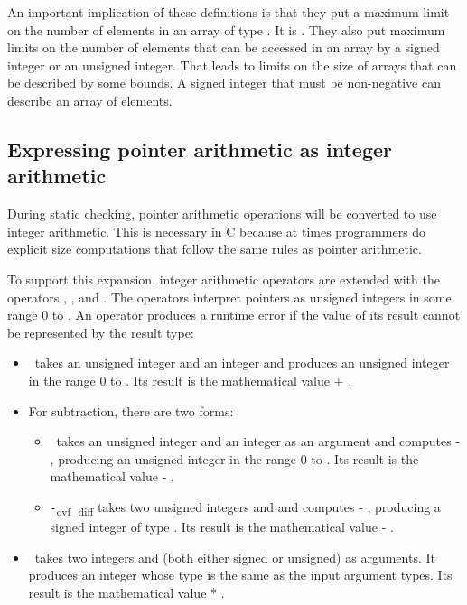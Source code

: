 An important implication of these definitions is that they put a maximum
limit on the number of elements in an array of type . It is
. They also put
maximum limits on the number of elements that can be accessed in an
array by a signed integer or an unsigned integer. That leads to limits
on the size of arrays that can be described by some bounds. A signed
integer that must be non-negative can describe an array of
 elements.

\subsection{Expressing pointer arithmetic as integer arithmetic}
\label{section:pointers-as-integers}

During static checking, pointer arithmetic operations will be converted
to use integer arithmetic. This is necessary in C because at times
programmers do explicit size computations that follow the same rules as
pointer arithmetic.

To support this expansion, integer arithmetic operators are extended
with the operators \plusovf, \minusovf, and \mulovf. The
operators interpret pointers as unsigned integers in some range 0 to
. An operator produces a runtime error if the value
of its result cannot be represented by the result type:

\begin{itemize}
\item
  \plusovf\ takes an unsigned integer  and an
  integer  and produces an unsigned integer in the range 0 to
  . Its result is the mathematical value  + .
\item
  For subtraction, there are two forms:

  \begin{itemize}
  \item
    \minusovf\ takes an unsigned integer  and an
    integer  as an argument and computes  - , producing an unsigned
    integer in the range 0 to . Its result is the
    mathematical value  - .
  \item
    \lstinline|-|\textsubscript{ovf\_diff } takes two unsigned integers 
    and  and computes  - , producing a signed integer of type
    . Its result is the mathematical value  - .
  \end{itemize}
\item
  \mulovf\ takes two integers  and  (both either
  signed or unsigned) as arguments. It produces an integer whose type is
  the same as the input argument types. Its result is the mathematical
  value  * .
\end{itemize}

